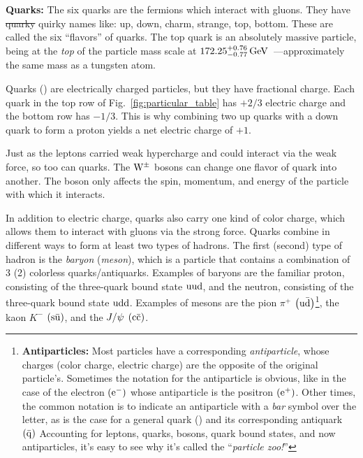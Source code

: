 

\textbf{Quarks:}
The six quarks are the fermions which interact with gluons.
They have \st{quarky} quirky names like: 
up, down, charm, strange, top, bottom. 
These are called the six ``flavors'' of quarks.
The top quark is an absolutely massive particle, being at the \emph{top} of the particle mass scale at $172.25^{+0.76}_{-0.77}\,\text{Ge\hspace{-.08em}V}$~\cite{Tumasyan:2779091}---approximately the same mass as a tungsten atom.

Quarks (\Pq) are electrically charged particles, but they have fractional charge.
Each quark in the top row of Fig.~\ref{fig:particular_table} has $+2/3$ electric charge and the bottom row has $-1/3$.
This is why combining two up quarks with a down quark to form a proton yields a net electric charge of $+1$.

Just as the leptons carried weak hypercharge and could interact via the weak force, so too can quarks. 
The $\mathrm{W}^{\pm}$ bosons can change one flavor of quark into another.
The \PZ boson only affects the spin, momentum, and energy of the particle with which it interacts.

In addition to electric charge, quarks also carry one kind of color charge, which allows them to interact with gluons via the strong force. 
Quarks combine in different ways to form at least two types of hadrons.
The first (second) type of hadron is the \emph{baryon} (\emph{meson}), which is a particle that contains a combination of 3 (2) colorless quarks/antiquarks.
Examples of baryons are the familiar proton, consisting of the three-quark bound state $\mathrm{u} \mathrm{u} \mathrm{d}$, and the neutron, consisting of the three-quark bound state $\mathrm{u} \mathrm{d} \mathrm{d}$.
Examples of mesons are the pion $\pi^+$ $\left(\mathrm{u} \bar{\mathrm{d}} \right)$\footnote{
    \textbf{Antiparticles:} Most particles have a corresponding \emph{antiparticle}, whose charges (\eg color charge, electric charge) are the opposite of the original particle's.
    Sometimes the notation for the antiparticle is obvious, like in the case of the electron $\left( \mathrm{e}^- \right)$ whose antiparticle is the positron $\left( \mathrm{e}^+ \right)$.
    Other times, the common notation is to indicate an antiparticle with a \emph{bar} symbol over the letter, as is the case for a general quark (\Pq) and its corresponding antiquark $\left( \bar{\mathrm{q}} \right)$
    Accounting for leptons, quarks, bosons, quark bound states, and now antiparticles, it's easy to see why it's called the ``\emph{particle zoo!}''
}, the kaon $K^-$ $\left(\mathrm{s} \bar{\mathrm{u}} \right)$, and the $J / \psi$ $\left( \mathrm{c} \bar{\mathrm{c}} \right)$.

